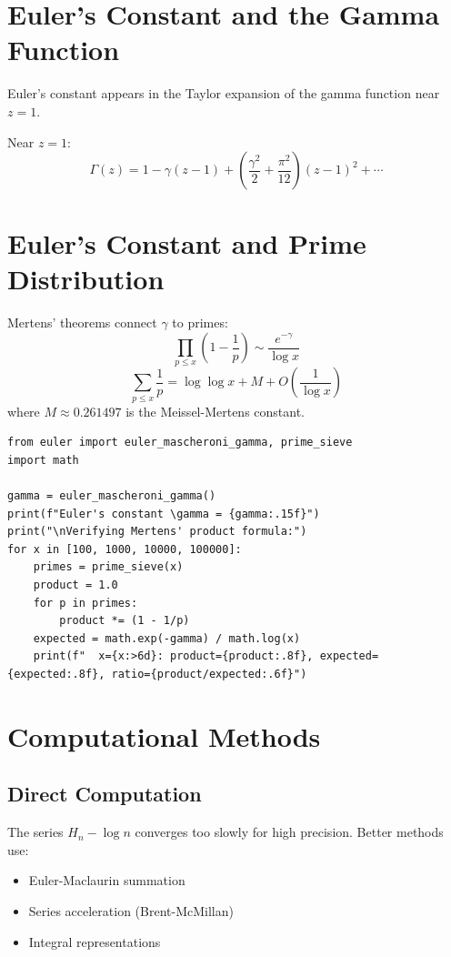 \section{Euler's Constant and the Gamma Function}

Euler's constant appears in the Taylor expansion of the gamma function near $z=1$.

\begin{theorem}
Near $z = 1$:
\[
\Gamma(z) = 1 - \gamma(z-1) + \left(\frac{\gamma^2}{2} + \frac{\pi^2}{12}\right)(z-1)^2 + \cdots
\]
\end{theorem}

\section{Euler's Constant and Prime Distribution}

Mertens' theorems connect $\gamma$ to primes:
\[
\prod_{p \le x} \left(1 - \frac{1}{p}\right) \sim \frac{e^{-\gamma}}{\log x}
\]
\[
\sum_{p \le x} \frac{1}{p} = \log \log x + M + O\left(\frac{1}{\log x}\right)
\]
where $M \approx 0.261497$ is the Meissel-Mertens constant.

\begin{lstlisting}[caption={Mertens' theorem verification}, label=lst:mertens]
from euler import euler_mascheroni_gamma, prime_sieve
import math

gamma = euler_mascheroni_gamma()
print(f"Euler's constant \gamma = {gamma:.15f}")
print("\nVerifying Mertens' product formula:")
for x in [100, 1000, 10000, 100000]:
    primes = prime_sieve(x)
    product = 1.0
    for p in primes:
        product *= (1 - 1/p)
    expected = math.exp(-gamma) / math.log(x)
    print(f"  x={x:>6d}: product={product:.8f}, expected={expected:.8f}, ratio={product/expected:.6f}")
\end{lstlisting}

\section{Computational Methods}

\subsection{Direct Computation}
The series $H_n - \log n$ converges too slowly for high precision. Better methods use:
\begin{itemize}
\item Euler-Maclaurin summation
\item Series acceleration (Brent-McMillan)
\item Integral representations
\end{itemize}

